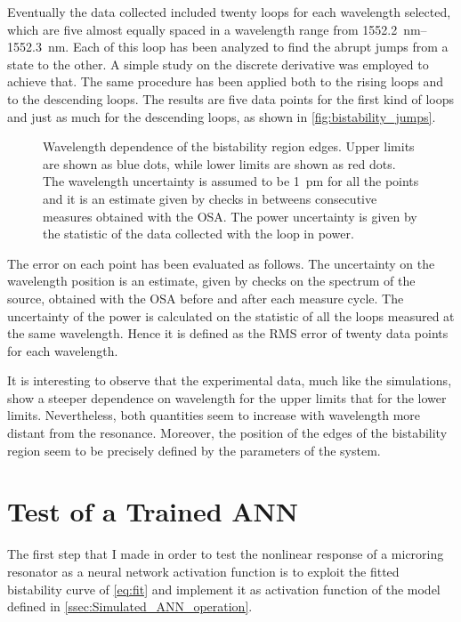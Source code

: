 Eventually the data collected included twenty loops for each wavelength selected, which are five almost equally spaced in a wavelength range from \SIrange{1552.2}{1552.3}{\nm}.
Each of this loop has been analyzed to find the abrupt jumps from a state to the other.
A simple study on the discrete derivative was employed to achieve that.
The same procedure has been applied both to the rising loops and to the descending loops.
The results are five data points for the first kind of loops and just as much for the descending loops, as shown in \autoref{fig:bistability_jumps}.

\begin{figure}[!hbtp]
	\centering
	
	\caption{Wavelength dependence of the bistability region edges.
		Upper limits are shown as blue dots, while lower limits are shown as red dots.
		The wavelength uncertainty is assumed to be \SI{1}{\pm} for all the points and it is an estimate given by checks in betweens consecutive measures obtained with the OSA.
		The power uncertainty is given by the statistic of the data collected with the loop in power.
	}
	\label{fig:bistability_jumps}
\end{figure}

The error on each point has been evaluated as follows.
The uncertainty on the wavelength position is an estimate, given by checks on the spectrum of the source, obtained with the \ac{OSA} before and after each measure cycle.
The uncertainty of the power is calculated on the statistic of all the loops measured at the same wavelength.
Hence it is defined as the RMS error of twenty data points for each wavelength.

It is interesting to observe that the experimental data, much like the simulations, show a steeper dependence on wavelength for the upper limits that for the lower limits.
Nevertheless, both quantities seem to increase with wavelength more distant from the resonance.
Moreover, the position of the edges of the bistability region seem to be precisely defined by the parameters of the system.

\section{Test of a Trained ANN}
\label{sec:Test_of_a_Trained ANN}
The first step that I made in order to test the nonlinear response of a microring resonator as a neural network activation function is to exploit the fitted bistability curve of \autoref{eq:fit} and implement it as activation function of the model defined in \autoref{ssec:Simulated_ANN_operation}.

